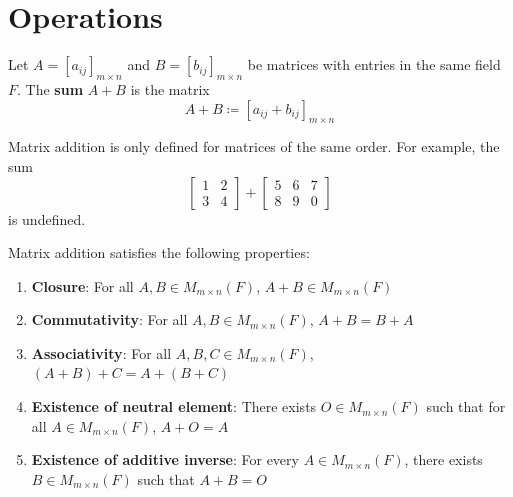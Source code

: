 \section{Operations}
\begin{definition}\label{def:matrix-addition}
    Let $A = [a_{ij}]_{m \times n}$ and $B = [b_{ij}]_{m \times n}$ be matrices with entries in the same field $F$. The \textbf{sum} $A + B$ is the matrix
    \[
    A + B \coloneqq [a_{ij} + b_{ij}]_{m \times n}
    \]
\end{definition}

\begin{note}
    Matrix addition is only defined for matrices of the same order. For example, the sum
    \[
    \begin{bmatrix} 1 & 2 \\ 3 & 4 \end{bmatrix} + \begin{bmatrix} 5 & 6 & 7 \\ 8 & 9 & 0 \end{bmatrix}
    \]
    is undefined.
\end{note}

\begin{proposition}\label{prop:matrix-addition-properties}
    Matrix addition satisfies the following properties:
    \begin{enumerate}[label=(\roman*)]
        \item \textbf{Closure}: For all $A, B \in M_{m \times n}(F)$, $A + B \in M_{m \times n}(F)$
        \item \textbf{Commutativity}: For all $A, B \in M_{m \times n}(F)$, $A + B = B + A$
        \item \textbf{Associativity}: For all $A, B, C \in M_{m \times n}(F)$, $(A + B) + C = A + (B + C)$
        \item \textbf{Existence of neutral element}: There exists $O \in M_{m \times n}(F)$ such that for all $A \in M_{m \times n}(F)$, $A + O = A$
        \item \textbf{Existence of additive inverse}: For every $A \in M_{m \times n}(F)$, there exists $B \in M_{m \times n}(F)$ such that $A + B = O$
    \end{enumerate}
\end{proposition}

